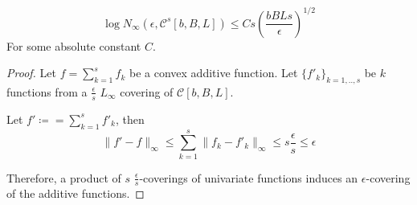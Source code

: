 \begin{lemma}
\[
\log N_\infty( \epsilon, \mathcal{C}^s[b,B,L])  \leq C s \left(\frac{bBLs}{\epsilon}\right)^{1/2}
\]
For some absolute constant $C$.
\end{lemma}

\begin{proof}
Let $f = \sum_{k=1}^s f_k$ be a convex additive function. Let $\{ f'_k \}_{k=1,..,s}$ be $k$ functions from a $\frac{\epsilon}{s}$ $L_\infty$ covering of $\mathcal{C}[b,B,L]$. 

Let $f' \coloneqq = \sum_{k=1}^s f'_k$, then 
\[
\| f' - f \|_{\infty} \leq \sum_{k=1}^s \| f_k - f'_k \|_\infty \leq s \frac{\epsilon}{s} \leq \epsilon
\]

Therefore, a product of $s$ $\frac{\epsilon}{s}$-coverings of univariate functions induces an $\epsilon$-covering of the additive functions.
\end{proof}




 

